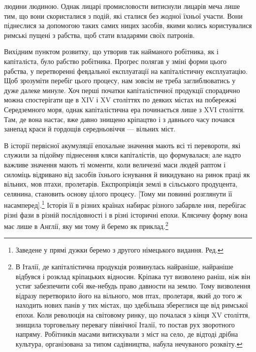 \parcont{}  %
людини людиною. Однак лицарі промисловости витиснули лицарів
меча лише тим, що вони скористалися з подій, які сталися
без жодної їхньої участи. Вони піднеслися за допомогою таких
самих ницих засобів, якими колись користувалися римські пущені
з рабства, щоб стати владарями своїх патронів.

Вихідним пунктом розвитку, що утворив так найманого робітника,
як і капіталіста, було рабство робітника. Проґрес полягав
у зміні форми цього рабства, у перетворенні февдальної експлуатації
на капіталістичну експлуатацію. Щоб зрозуміти перебіг
цього процесу, нам зовсім не треба заглиблюватись у дуже
далеке минуле. Хоч перші початки капіталістичної продукції
спорадично можна спостерігати ще в XIV і XV століттях по
деяких містах на побережжі Середземного моря, однак капіталістична
ера починається лише з XVI століття. Там, де вона настає,
вже давно знищено кріпацтво і з давнього часу почався
занепад краси й гордощів середньовіччя — вільних міст.

В історії первісної акумуляції епохальне значення мають всі
ті перевороти, які служили за підойму піднесення кляси капіталістів,
що формувалася; але надто важливе значення мають
ті моменти, коли величезні маси людей раптом і силоміць відривано
від засобів їхнього існування й викидувано на ринок праці
як вільних, мов птахи, пролетарів. Експропріяція землі в сільського
продуцента, селянина, становить основу цілого процесу.
[Тому ми повинні розглянути її насамперед].\footnote*{
Заведене у прямі дужки беремо з другого німецького видання. Ред.
} Історія її в
різних країнах набирає різного забарвле ння, перебігає різні
фази в різній послідовності і в різні історичні епохи. Клясичну
форму вона має лише в Англії, яку ми тому й беремо як приклад.\footnote{
В Італії, де капіталістична продукція розвинулась найраніше,
найраніше відбувся і розклад кріпацьких відносин. Кріпака тут визволено
раніш, ніж він устиг забезпечити собі яке-небудь право давности на
землю. Тому визволення відразу перетворило його на вільного, мов
птах, пролетаря, який до того ж находить нових панів у тих містах, що
здебільша збереглися ще від римської епохи. Коли революція на світовому
ринку, що почалася з кінця XV століття, знищила торговельну
перевагу північної Італії, то постав рух зворотного напряму. Робітників
масами витискували з міст на село, де відтоді дрібна культура, організована
за типом садівництва, набула нечуваного розквіту.
}

